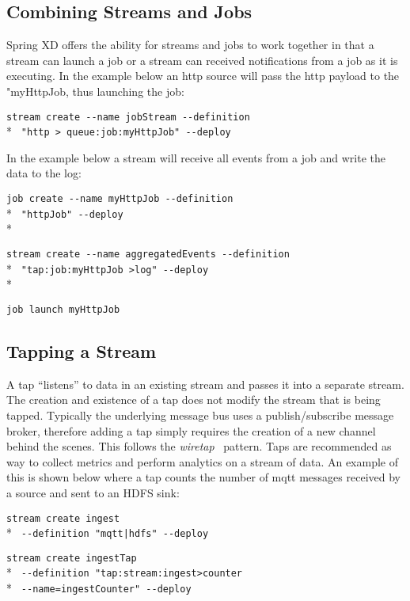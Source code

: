 \subsection {Combining Streams and Jobs}

Spring XD offers the ability for streams and jobs to work together in that
a stream can launch a job or a stream can received notifications from a job
as it is executing.  In the example below an http source will pass the http
payload to the "myHttpJob, thus launching the job:

\verb;stream create --name jobStream --definition ;\\*
\verb; "http > queue:job:myHttpJob" --deploy;

In the example below a stream will receive all events from a job and write
the data to the log:

\verb;job create --name myHttpJob --definition;\\*
\verb; "httpJob" --deploy;\\*

\verb;stream create --name aggregatedEvents --definition;\\*
\verb; "tap:job:myHttpJob >log" --deploy;\\*

\verb;job launch myHttpJob;

\subsection {Tapping a Stream} \label{sssec:deploytap}

A tap ``listens'' to data in an existing stream and passes it into a separate
stream. The creation and existence of a tap does not modify the stream that
is being tapped. Typically the underlying message bus uses a publish/subscribe
message broker, therefore adding a tap simply requires the creation of
a new channel behind the scenes. This follows the \emph{wiretap}~\cite{wiretap}
pattern.  Taps are recommended as way to collect metrics and perform
analytics on a stream of data. An example of this is shown below where a
tap counts the number of mqtt messages received by a source and sent to an
HDFS sink:

\verb;stream create ingest;\\*
\verb; --definition "mqtt|hdfs" --deploy;

\verb;stream create ingestTap;\\*
\verb; --definition "tap:stream:ingest>counter;\\*
\verb; --name=ingestCounter" --deploy;

